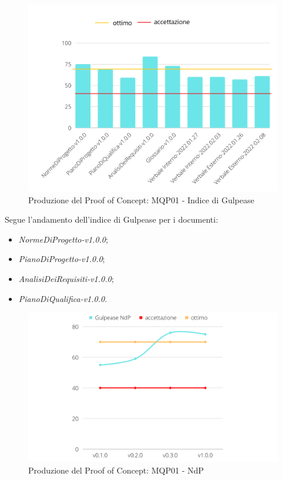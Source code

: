\begin{figure}[H]
    \centering
    \includegraphics[scale=0.50]{Sezioni/images/poc-gulpease.png}
    \caption{Produzione del Proof of Concept: MQP01 - Indice di Gulpease}
\end{figure}

Segue l'andamento dell'indice di Gulpease per i documenti:
\begin{itemize}
    \item \textit{NormeDiProgetto-v1.0.0};
    \item \textit{PianoDiProgetto-v1.0.0};
    \item \textit{AnalisiDeiRequisiti-v1.0.0};
    \item \textit{PianoDiQualifica-v1.0.0}.
\end{itemize}

\begin{figure}[H]
    \centering
    \includegraphics[scale=0.50]{Sezioni/images/poc-gulpease-ndp.png}
    \caption{Produzione del Proof of Concept: MQP01 - NdP}
\end{figure}


